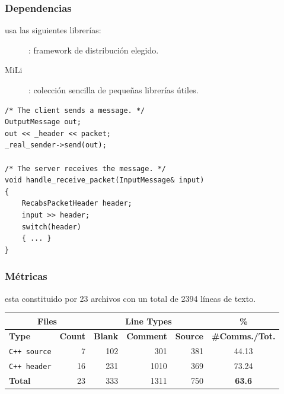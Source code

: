 \begin{frame}[fragile]\frametitle{Dependencias}

    \rc{} usa las siguientes librerías:
    \begin{description}
        \item[\fud]: framework de distribución elegido.
        \item[MiLi]: colección sencilla de pequeñas librerías útiles.
    \end{description}

    \lstset{language=C++}
    \begin{lstlisting}[frame=single]
/* The client sends a message. */
OutputMessage out;
out << _header << packet;
_real_sender->send(out);

/* The server receives the message. */
void handle_receive_packet(InputMessage& input)
{
    RecabsPacketHeader header;
    input >> header;
    switch(header)
    { ... }
}
    \end{lstlisting}
\end{frame}

\begin{frame}\frametitle{Métricas}
    \rc{} esta constituido por 23 archivos con un total de 2394 líneas de texto.

    \begin{center}
    \begin{tabular}{|l|r|r|r|r|c|}
    \hline
    \multicolumn{2}{|c|}{Files} & \multicolumn{3}{|c|}{Line Types} & \hspace{0.2cm}\% \\
    \hline
    \textbf{Type} & \textbf{Count} & \textbf{Blank} & \textbf{Comment} & \textbf{Source} & \small{\textbf{\#Comms./Tot.}}\\
    \hline
    \texttt{C++ source} & 7   &    102  &     301   &    381 & 44.13 \\
    \hline
    \texttt{C++ header} & 16   &    231  &    1010   &    369 &  73.24 \\
    \hline
    \textbf{Total}      &  23  &     333 & \color{blue}1311\color{black} & \color{blue}750\color{black} & \textbf{63.6} \\
    \hline
    \end{tabular}
    \end{center}
\end{frame}

